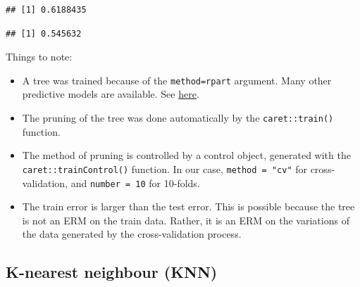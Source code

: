\documentclass[]{book}
\newenvironment{Shaded}{\begin{snugshade}}{\end{snugshade}}
\newcommand{\KeywordTok}[1]{\textcolor[rgb]{0.13,0.29,0.53}{\textbf{#1}}}
\newcommand{\DataTypeTok}[1]{\textcolor[rgb]{0.13,0.29,0.53}{#1}}
\newcommand{\DecValTok}[1]{\textcolor[rgb]{0.00,0.00,0.81}{#1}}
\newcommand{\StringTok}[1]{\textcolor[rgb]{0.31,0.60,0.02}{#1}}
\newcommand{\CommentTok}[1]{\textcolor[rgb]{0.56,0.35,0.01}{\textit{#1}}}
\newcommand{\OperatorTok}[1]{\textcolor[rgb]{0.81,0.36,0.00}{\textbf{#1}}}
\newcommand{\NormalTok}[1]{#1}
\providecommand{\tightlist}{%
  \setlength{\itemsep}{0pt}\setlength{\parskip}{0pt}}
\theoremstyle{definition}
\theoremstyle{definition}
\theoremstyle{definition}
\theoremstyle{remark}
\begin{document}
\begin{Shaded}
\end{Shaded}

\begin{verbatim}
## [1] 0.6188435
\end{verbatim}

\begin{Shaded}
\end{Shaded}

\begin{verbatim}
## [1] 0.545632
\end{verbatim}

Things to note:

\begin{itemize}
\tightlist
\item
  A tree was trained because of the
  \texttt{method=\textquotesingle{}rpart\textquotesingle{}} argument.
  Many other predictive models are available. See
  \href{http://topepo.github.io/caret/available-models.html}{here}.
\item
  The pruning of the tree was done automatically by the
  \texttt{caret::train()} function.
\item
  The method of pruning is controlled by a control object, generated
  with the \texttt{caret::trainControl()} function. In our case,
  \texttt{method\ =\ "cv"} for cross-validation, and
  \texttt{number\ =\ 10} for 10-folds.
\item
  The train error is larger than the test error. This is possible
  because the tree is not an ERM on the train data. Rather, it is an ERM
  on the variations of the data generated by the cross-validation
  process.
\end{itemize}

\subsection{K-nearest neighbour (KNN)}\label{k-nearest-neighbour-knn}
\end{document}
